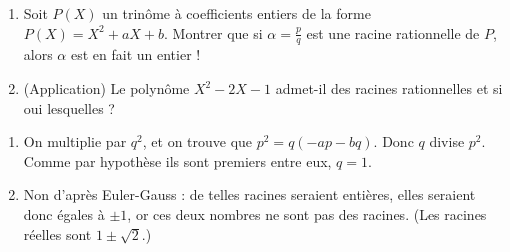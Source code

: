 \begin{exo}
\begin{enumerate}
\item  Soit $P(X)$ un trinôme à coefficients entiers de la forme $P(X) = X^2+aX+b$. Montrer que si $\alpha = \frac{p}{q}$ est une racine rationnelle de $P$, alors $\alpha$ est en fait un entier !
\item (Application) Le polynôme $X^2-2X-1$ admet-il des racines rationnelles et si oui lesquelles ? 
\end{enumerate}
\begin{sol}
\begin{enumerate}
\item On multiplie par $q^2$, et on trouve que $p^2=q(-ap-bq)$. Donc $q$ divise $p^2$. Comme par hypothèse ils sont premiers entre eux, $q=1$.
\item Non d'après Euler-Gauss : de telles racines seraient entières, elles seraient donc égales à $\pm 1$, or ces deux nombres ne sont pas des racines. (Les racines réelles sont $1\pm \sqrt 2$.)
\end{enumerate}
\end{sol}
\end{exo}

\begin{comment}
\begin{exo}
Déterminer les valeurs de $m\in \N$ pour lesquelles le polynôme $X^2+mX+4$ possède des racines dans rationnelles et déterminer ces racines.
 \begin{sol}
 Premièrement, d'après l'exercice précédent (Euler-Gauss), si une racine est rationnelle alors elle est entière. Cherchons donc à quelle condition une racine peut être entière.
 
Si le polynôme a des racines entières, le produit de ces racines vaut $4$, donc en considérant les diviseurs de $4$ on obtient toutes les possibilités : les racines sont $(1,4)$, $(-1,-4)$,  $(2,2)$ ou $(-2,-2)$.
 D'autre part la somme des racines vaut $-m$, qui doit être un entier \emph{négatif} par hypothèse.  Les possibilités pour $m$ sont donc $4$ ou $5$.
 
En conclusion, si $m\in \N$, alors le polynôme $X^2+mX+4$ a des racines entières si et seulement si $m$ vaut $4$ ou $5$, et dans ce cas les racines sont $-2$ et $-2$, ou alors $-1$ et $-4$.
\end{sol}
\end{exo}
\end{comment}


